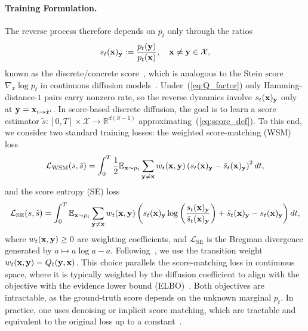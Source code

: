 \documentclass{article} %
\def\eqref#1{equation~\ref{#1}}
\newcommand{\bfx}{{\bf x}}
\newcommand{\bfy}{ {\bf y}}
\newcommand{\xito}{\mathbf{x}_{i \to \hat{x}^i}}
\newcommand{\sito}{s_t(\bfx)_{i \to \hat{x}^i}}
\newcommand{\half}{\frac{1}{2}}
\newcommand{\LWSM}{\mathcal{L}_{\mathrm{WSM}}}
\newcommand{\LSE}{\mathcal{L}_{\mathrm{SE}}}
\renewcommand{\eqref}[1]{\textup{(\ref{#1})}}
\begin{document}
\paragraph{Training Formulation.} 
The reverse process therefore depends on $p_t$ only through the ratios
\begin{equation}\label{eq:score_def}
    s_t(\bfx)_{\bfy} := \frac{p_t(\bfy)}{p_t(\bfx)}, \quad \bfx \neq \bfy \in \mathcal{X},
\end{equation}
known as the discrete/concrete score~\citep{meng2022concrete}, which is analogous to the Stein score $\nabla_x \log p_t$ in continuous diffusion models~\citep{song2021scorebased}. Under~\eqref{eq:Q_factor} only Hamming-distance-$1$ pairs carry nonzero rate, so the
reverse dynamics involve $s_t(\bfx)_{\bfy}$ only at $\bfy = \xito$. In score-based discrete diffusion, the goal is to learn a score estimator $\tilde{s}: [0, T] \times \mathcal{X} \to \mathbb{R}^{d(S-1)}$ approximating~\eqref{eq:score_def}. To this end, we consider two standard training losses: the weighted score-matching (WSM) loss~\citep{meng2022concrete}
\begin{equation}\label{eq:LWSM}
    \LWSM(s, \tilde{s})=\int_0^T \half \mathbb{E}_{\bfx \sim p_t}
    \sum_{\bfy \neq \bfx}  w_t{(\bfx,\bfy)} \left( s_t(\bfx)_\bfy - \tilde{s}_t(\bfx)_\bfy \right)^2 dt,
\end{equation}
and the score entropy (SE) loss~\citep{benton2024denoising,lou2024discrete}
\begin{equation}\label{eq:LSE}
    \LSE(s, \tilde{s})=\int_0^T \mathbb{E}_{\bfx \sim p_t}
    \sum_{\bfy \neq \bfx}  w_t{(\bfx,\bfy)} \left( s_t(\bfx)_\bfy \log\left( \frac{s_t(\bfx)_\bfy}{\tilde{s}_t(\bfx)_\bfy}\right) + \tilde{s}_t(\bfx)_\bfy - s_t(\bfx)_\bfy \right) dt,
\end{equation}
where $w_t{(\bfx,\bfy)} \geq 0$ are weighting coefficients, and $\LSE$ is the Bregman divergence generated by $a \mapsto a \log a - a$. Following~\cite{lou2024discrete}, we use the transition weight $w_t{(\bfx,\bfy)}=Q_t(\bfy, \bfx)$. This choice parallels the score-matching loss in continuous
space, where it is typically weighted by the diffusion coefficient to align with the objective with the
evidence lower bound (ELBO)~\citep{song2021scorebased}.  Both objectives are intractable, as the ground-truth score depends on the unknown marginal $p_t$. In practice, one uses denoising or implicit score matching, which are tractable and equivalent to the original loss up to a constant~\citep{lou2024discrete}.
 
\end{document}
